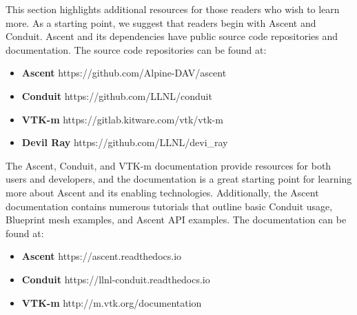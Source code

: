 This section highlights additional resources for those readers who
wish to learn more.
%
As a starting point, we suggest that readers begin with Ascent and
Conduit.
%
Ascent and its dependencies have public source code repositories and
documentation.
%
The source code repositories can be found at:
\begin{itemize}
  \item \textbf{Ascent} https://github.com/Alpine-DAV/ascent
  \item \textbf{Conduit} https://github.com/LLNL/conduit
  \item \textbf{VTK-m} https://gitlab.kitware.com/vtk/vtk-m
  \item \textbf{Devil Ray} https://github.com/LLNL/devi\_ray
\end{itemize}

The Ascent, Conduit, and VTK-m documentation provide resources for both users and
developers, and the documentation is a great starting point for learning more about
Ascent and its enabling technologies.
%
Additionally, the Ascent documentation contains numerous tutorials that
outline basic Conduit usage, Blueprint mesh examples, and Ascent API examples.
The documentation can be found at:
\begin{itemize}
  \item \textbf{Ascent} https://ascent.readthedocs.io
  \item \textbf{Conduit} https://llnl-conduit.readthedocs.io
  \item \textbf{VTK-m} http://m.vtk.org/documentation
\end{itemize}
